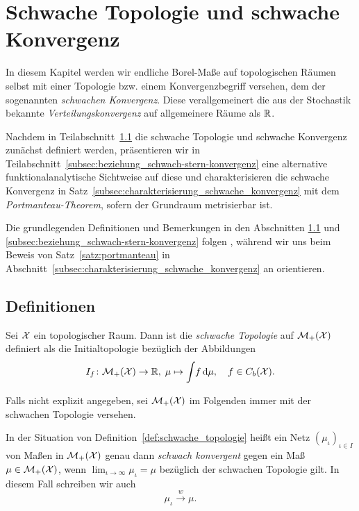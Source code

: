 \documentclass[../main/main.tex]{subfiles}
\begin{document}
	
	\section{Schwache Topologie und schwache Konvergenz}
	
	In diesem Kapitel werden wir endliche Borel-Maße auf topologischen Räumen selbst
	mit einer Topologie bzw. einem Konvergenzbegriff versehen, dem der sogenannten \emph{schwachen Konvergenz}. Diese
	verallgemeinert die aus der Stochastik bekannte \emph{Verteilungskonvergenz} auf allgemeinere Räume als $\mathbb{R}$. 
	
	Nachdem in Teilabschnitt~\ref{subsec:definition} die schwache Topologie und schwache Konvergenz zunächst definiert werden, präsentieren wir in Teilabschnitt~\ref{subsec:beziehung_schwach-stern-konvergenz}
	eine alternative funktionalanalytische Sichtweise auf diese und charakterisieren die schwache Konvergenz in Satz~\ref{subsec:charakterisierung_schwache_konvergenz} mit dem \emph{Portmanteau-Theorem},
	sofern der Grundraum metrisierbar ist.
	
	Die grundlegenden Definitionen und Bemerkungen in den Abschnitten \ref{subsec:definition} und \ref{subsec:beziehung_schwach-stern-konvergenz} folgen 
	\cite[Abschnitte 1-3]{Varadarajan.1958}, während wir uns beim Beweis von Satz~\ref{satz:portmanteau} in Abschnitt~\ref{subsec:charakterisierung_schwache_konvergenz}
	an \cite[Satz 4.14.4]{Simon.2015} orientieren.

	\subsection{Definitionen}
	\label{subsec:definition}
	
	\begin{Definition}
		\label{def:schwache_topologie}
		Sei $\mathcal{X}$ ein topologischer Raum. Dann ist die \emph{schwache Topologie} auf $\mathcal{M}_{+}(\mathcal{X})$ definiert als die 
		Initialtopologie bezüglich der Abbildungen
		\[ I_f \colon \mathcal{M}_{+}(\mathcal{X}) \to \mathbb{R}, \; \mu \mapsto \int_{} \, f \, \mathrm{d}\mu , \quad f \in C_b(\mathcal{X}) \text{.} \]
	\end{Definition}

	Falls nicht explizit angegeben, sei $\mathcal{M}_{+}(\mathcal{X})$ im Folgenden immer mit der schwachen Topologie versehen.

	\begin{Definition}
		In der Situation von Definition~\ref{def:schwache_topologie} heißt ein Netz $(\mu_\iota)_{\iota \in I}$ von Maßen in $\mathcal{M}_{+}(\mathcal{X})$ genau dann 
		\emph{schwach konvergent} gegen ein Maß $\mu \in \mathcal{M}_{+}(\mathcal{X})$, wenn $\lim_{\iota \to \infty} \mu_\iota = \mu$ bezüglich der schwachen Topologie gilt.
		In diesem Fall schreiben wir auch
		\[ \mu_\iota \xrightarrow{w} \mu \text{.} \]
	\end{Definition}
\end{document}
